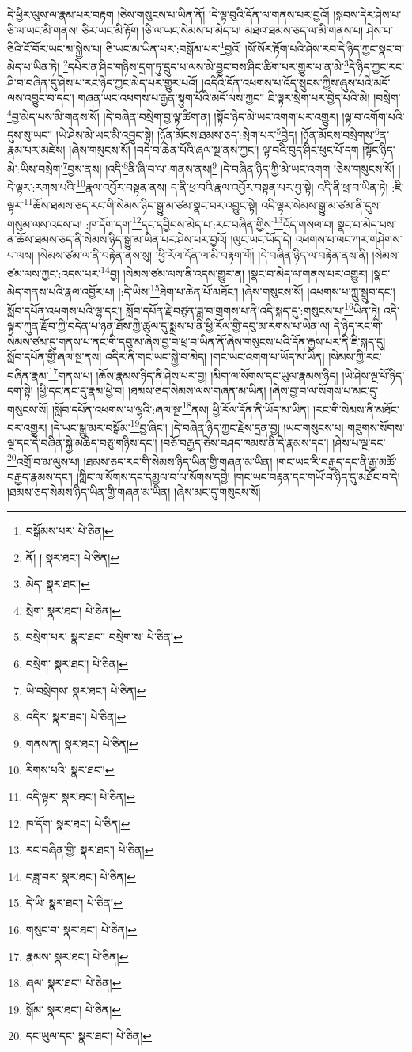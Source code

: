 དེ་ཕྱིར་ལུས་ལ་རྣམ་པར་བརྟག །ཅེས་གསུངས་པ་ཡིན་ནོ། །དེ་ལྟ་བུའི་དོན་ལ་གནས་པར་བྱའོ། །སྐབས་དེར་ཤེས་པ་ཅི་ལ་ཡང་མི་གནས། ཅིར་ཡང་མི་རྟོག །ཅི་ལ་ཡང་སེམས་པ་མེད་པ། མཐའ་ཐམས་ཅད་ལ་མི་གནས་པ། ཤེས་པ་ཅིའི་ངོ་བོར་ཡང་མ་སྐྱེས་པ། ཅི་ཡང་མ་ཡིན་པར་:བསྒོམ་པར་\footnote{བསྒོམས་པར་  པེ་ཅིན། }བྱའོ། །སོ་སོར་རྟོག་པའི་ཤེས་རབ་དེ་ཉིད་ཀྱང་སྣང་བ་མེད་པ་ཡིན་ཏེ། \footnote{ནོ། །   སྣར་ཐང་།  པེ་ཅིན། }དཔེར་ན་ཤིང་གཉིས་དྲག་ཏུ་དྲུད་པ་ལས་མེ་བྱུང་བས་ཤིང་ཚིག་པར་གྱུར་པ་ན་མེ་\footnote{མེད་  སྣར་ཐང་། }དེ་ཉིད་ཀྱང་རང་ཤི་བ་བཞིན་དུ་ཤེས་པ་རང་ཉིད་ཀྱང་མེད་པར་གྱུར་པའོ། །འདིའི་དོན་འཕགས་པ་འོད་སྲུངས་ཀྱིས་ཞུས་པའི་མདོ་ལས་འབྱུང་བ་དང་། གཞན་ཡང་འཕགས་པ་རྒྱན་སྟུག་པོའི་མདོ་ལས་ཀྱང་། ཇི་ལྟར་སྲེག་པར་བྱེད་པའི་མེ། །བསྲེག་\footnote{སྲེག་  སྣར་ཐང་།  པེ་ཅིན། }བྱ་མེད་པས་མི་གནས་སོ། །དེ་བཞིན་བསྲེག་བྱ་ལྟ་ཚིག་ན། །སྟོང་ཉིད་མེ་ཡང་འགག་པར་འགྱུར། །ལྟ་བ་འགོག་པའི་དུས་སུ་ཡང་། །ཡེ་ཤེས་མེ་ཡང་མི་འབྱུང་སྟེ། །ཉོན་མོངས་ཐམས་ཅད་:སྲེག་པར་\footnote{བསྲེག་པར་  སྣར་ཐང་། བསྲེག་ས་  པེ་ཅིན། }བྱེད། །ཉོན་མོངས་བསྲེགས་\footnote{བསྲེག་  སྣར་ཐང་།  པེ་ཅིན། }ན་རྣམ་པར་མཛེས། །ཞེས་གསུངས་སོ། །བདེ་བ་ཆེན་པོའི་ཞལ་སྔ་ནས་ཀྱང་། ལྟ་བའི་བུད་ཤིང་ཕུང་པོ་དག །སྟོང་ཉིད་མེ་:ཡིས་བསྲེག་\footnote{ཡི་བསྲེགས་  སྣར་ཐང་།  པེ་ཅིན། }བྱས་ནས། །འདི་\footnote{འདིར་  སྣར་ཐང་།  པེ་ཅིན། }ནི་ཞི་བ་ལ་:གནས་ནས།\footnote{གནས་ན།  སྣར་ཐང་།  པེ་ཅིན། } །དེ་བཞིན་ཉིད་ཀྱི་མེ་ཡང་འགག །ཅེས་གསུངས་སོ། །དེ་ལྟར་:རགས་པའི་\footnote{རིགས་པའི་  སྣར་ཐང་། }རྣལ་འབྱོར་བསྟན་ནས། ད་ནི་ཕྲ་བའི་རྣལ་འབྱོར་བསྟན་པར་བྱ་སྟེ། འདི་ནི་ཕྲ་བ་ཡིན་ཏེ། :ཇི་ལྟར་\footnote{འདི་ལྟར་  སྣར་ཐང་།  པེ་ཅིན། }ཆོས་ཐམས་ཅད་རང་གི་སེམས་ཉིད་སྒྱུ་མ་ཙམ་སྣང་བར་འབྱུང་སྟེ། འདི་ལྟར་སེམས་སྒྱུ་མ་ཙམ་ནི་དུས་གསུམ་ལས་འདས་པ། :ཁ་དོག་དག་\footnote{ཁ་དོག་  སྣར་ཐང་།  པེ་ཅིན། }དང་དབྱིབས་མེད་པ་:རང་བཞིན་གྱིས་\footnote{རང་བཞིན་གྱི་  སྣར་ཐང་།  པེ་ཅིན། }འོད་གསལ་བ། སྣང་བ་མེད་པས་ན་ཆོས་ཐམས་ཅད་ནི་སེམས་ཉིད་སྒྱུ་མ་ཡིན་པར་ཤེས་པར་བྱའོ། །ལུང་ཡང་ཡོད་དེ། འཕགས་པ་ལང་ཀར་གཤེགས་པ་ལས། །སེམས་ཙམ་ལ་ནི་བརྟེན་ནས་སུ། །ཕྱི་རོལ་དོན་ལ་མི་བརྟག་གོ། །དེ་བཞིན་ཉིད་ལ་བརྟེན་ནས་ནི། །སེམས་ཙམ་ལས་ཀྱང་:འདས་པར་\footnote{བཟླ་བར་  སྣར་ཐང་།  པེ་ཅིན། }བྱ། །སེམས་ཙམ་ལས་ནི་འདས་གྱུར་ན། །སྣང་བ་མེད་ལ་གནས་པར་འགྱུར། །སྣང་མེད་གནས་པའི་རྣལ་འབྱོར་པ། །:དེ་ཡིས་\footnote{དེ་ཡི་  སྣར་ཐང་།  པེ་ཅིན། }ཐེག་པ་ཆེན་པོ་མཐོང་། །ཞེས་གསུངས་སོ། །འཕགས་པ་ཀླུ་སྒྲུབ་དང་། སློབ་དཔོན་འཕགས་པའི་ལྷ་དང་། སློབ་དཔོན་རྗེ་བཙུན་ཟླ་བ་གྲགས་པ་ནི་འདི་སྐད་དུ་:གསུངས་པ་\footnote{གསུང་བ་  སྣར་ཐང་།  པེ་ཅིན། }ཡིན་ཏེ། འདི་ལྟར་ཀུན་རྫོབ་ཀྱི་བདེན་པ་ཉན་ཐོས་ཀྱི་ཚུལ་དུ་སྨྲས་པ་ནི་ཕྱི་རོལ་གྱི་དབུ་མ་རགས་པ་ཡིན་ལ། དེ་ཉིད་རང་གི་སེམས་ཙམ་དུ་གནས་པ་ནང་གི་དབུ་མ་ཞེས་བྱ་བ་ཕྲ་བ་ཡིན་ནོ་ཞེས་གསུངས་པའི་དོན་རྒྱས་པར་ནི་ཇི་སྐད་དུ། སློབ་དཔོན་གྱི་ཞལ་སྔ་ནས། འདིར་ནི་གང་ཡང་སྐྱེ་བ་མེད། །གང་ཡང་འགག་པ་ཡོད་མ་ཡིན། །སེམས་ཀྱི་རང་བཞིན་རྣམ་\footnote{རྣམས་  སྣར་ཐང་།  པེ་ཅིན། }གནས་པ། །ཆོས་རྣམས་ཉིད་ནི་ཤེས་པར་བྱ། །མིག་ལ་སོགས་དང་ཡུལ་རྣམས་ཉིད། །ཡེ་ཤེས་ལྔ་པོ་ཉིད་དག་སྟེ། །ཕྱི་དང་ནང་དུ་རྣམ་ཕྱེ་བ། །ཐམས་ཅད་སེམས་ལས་གཞན་མ་ཡིན། །ཞེས་བྱ་བ་ལ་སོགས་པ་མང་དུ་གསུངས་སོ། །སློབ་དཔོན་འཕགས་པ་ལྷའི་:ཞལ་སྔ་\footnote{ཞལ་  སྣར་ཐང་།  པེ་ཅིན། }ནས། ཕྱི་རོལ་དོན་ནི་ཡོད་མ་ཡིན། །རང་གི་སེམས་ནི་མཐོང་བར་འགྱུར། །དེ་ཡང་སྒྱུ་མར་བསྒོམ་\footnote{སྒོམ་  སྣར་ཐང་།  པེ་ཅིན། }བྱ་ཞིང་། །དེ་བཞིན་ཉིད་ཀྱང་རྗེས་དྲན་བྱ། །ཡང་གསུངས་པ། གཟུགས་སོགས་ལྔ་དང་དེ་བཞིན་སྐྱེ་མཆེད་བཅུ་གཉིས་དང་། །བཅོ་བརྒྱད་ཅེས་བཤད་ཁམས་ནི་དེ་རྣམས་དང་། །ཤེས་པ་ལྔ་དང་\footnote{དང་ཡུལ་དང་  སྣར་ཐང་།  པེ་ཅིན། }འགྲོ་བ་མ་ལུས་པ། །ཐམས་ཅད་རང་གི་སེམས་ཉིད་ཡིན་གྱི་གཞན་མ་ཡིན། །གང་ཡང་རི་བརྒྱད་དང་ནི་རྒྱ་མཚོ་བརྒྱད་རྣམས་དང་། །གླིང་ལ་སོགས་དང་དམྱལ་བ་ལ་སོགས་དབྱེ། །གང་ཡང་བརྟན་དང་གཡོ་བ་ཉིད་དུ་མཐོང་བ་དེ། །ཐམས་ཅད་སེམས་ཉིད་ཡིན་གྱི་གཞན་མ་ཡིན། །ཞེས་མང་དུ་གསུངས་སོ། 